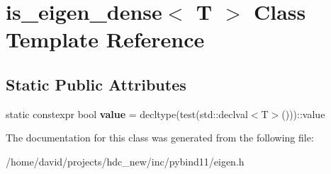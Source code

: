 \hypertarget{classis__eigen__dense}{}\section{is\+\_\+eigen\+\_\+dense$<$ T $>$ Class Template Reference}
\label{classis__eigen__dense}
\subsection*{Static Public Attributes}
\begin{DoxyCompactItemize}
\item 
static constexpr bool {\bfseries value} = decltype(test(std\+::declval$<$T$>$()))\+::value\hypertarget{classis__eigen__dense_a7cd64f7d7f9b7d8f2238cf68e33c424c}{}\label{classis__eigen__dense_a7cd64f7d7f9b7d8f2238cf68e33c424c}

\end{DoxyCompactItemize}


The documentation for this class was generated from the following file\+:\begin{DoxyCompactItemize}
\item 
/home/david/projects/hdc\+\_\+new/inc/pybind11/eigen.\+h\end{DoxyCompactItemize}

